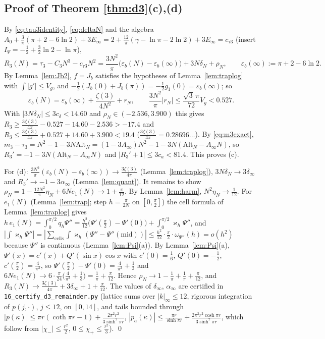 \documentclass[11pt,a4paper]{article}
\theoremstyle{plain}
\theoremstyle{definition}
\numberwithin{equation}{section}
\begin{document}
\subsection{Proof of Theorem \ref{thm:d3}(c),(d)}
By \eqref{eq:tau3identity}, \eqref{eq:deltaN} and the algebra $A_0+\frac3\pi(\pi+2-6\ln2)+3E_\infty=2+\frac{12}\pi(\gamma-\ln\pi-2\ln2)+3E_\infty=c_{\tau3}$ (insert $I_\Psi=-\frac12+\frac32\ln2-\ln\pi$),
\begin{equation}\label{eq:R3}
R_3(N)=\tau_3-C_3N^3-c_{\tau3}N^2=\frac{3N^2}{\pi}\big(\varepsilon_b(N)-\varepsilon_b(\infty)\big)+3N\delta_N+\rho_N,\qquad\varepsilon_b(\infty):=\pi+2-6\ln2 .
\end{equation}
By Lemma~\ref{lem:Jb2}, $f=J_b$ satisfies the hypotheses of Lemma~\ref{lem:traplog} with $\int|g'|\le V_g$, and $-\frac12(J_b(0)+J_b(\pi))=-\frac12g_1(0)=\varepsilon_b(\infty)$; so
\[
\varepsilon_b(N)=\varepsilon_b(\infty)+\frac{\zeta(3)}{4N^2}+r_N,\qquad\frac{3N^2}{\pi}|r_N|\le\frac{\sqrt3\,\pi}{72}V_g<0.527 .
\]
With $|3N\delta_N|\le3c_\delta<14.60$ and $\rho_N\in(-2.536,3.900)$ this gives
$R_3\ge\frac{3\zeta(3)}{4\pi}-0.527-14.60-2.536>-17.4$ and $R_3\le\frac{3\zeta(3)}{4\pi}+0.527+14.60+3.900<19.4$ ($\frac{3\zeta(3)}{4\pi}=0.28696\ldots$).
By \eqref{eq:m3exact}, $m_3-\tau_3=N^2-1-3N\mathrm{Alt}_N=(1-3A_\infty)N^2-1-3N(\mathrm{Alt}_N-A_\infty N)$, so $R_3'=-1-3N(\mathrm{Alt}_N-A_\infty N)$ and $|R_3'+1|\le3c_a<81.4$. This proves (c).

For (d): $\frac{3N^2}{\pi}(\varepsilon_b(N)-\varepsilon_b(\infty))\to\frac{3\zeta(3)}{4\pi}$ (Lemma~\ref{lem:traplog}), $3N\delta_N\to3\delta_\infty$ and $R_3'\to-1-3\alpha_\infty$ (Lemma~\ref{lem:quant}). It remains to show $\rho_N=1-\frac{12N^2}{\pi}\eta_N+6Ne_1(N)\to1+\frac\pi{12}$. By Lemma~\ref{lem:harm}, $N^2\eta_N\to\frac1{12}$. For $e_1(N)$ (Lemma~\ref{lem:trap}; step $h=\frac{\pi}{2N}$ on $[0,\frac\pi2]$) the cell formula of Lemma~\ref{lem:traplog} gives $h\,e_1(N)=\int_0^{\pi/2}q_h\Psi''=\frac{h^2}{12}\big(\Psi'(\frac\pi2)-\Psi'(0)\big)+\int_0^{\pi/2}\varkappa_h\Psi''$, and $|\int\varkappa_h\Psi''|=|\sum_{\mathrm{cells}}\int\varkappa_h(\Psi''-\Psi''(\mathrm{mid}))|\le\frac{h^2}{12}\cdot\frac\pi2\cdot\omega_{\Psi''}(h)=o(h^2)$ because $\Psi''$ is continuous (Lemma~\ref{lem:Psi}(a)). By Lemma~\ref{lem:Psi}(a), $\Psi'(x)=c'(x)+Q'(\sin x)\cos x$ with $c'(0)=\frac16$, $Q'(0)=-\frac12$, $c'(\frac\pi2)=\frac{4}{\pi^2}$, so $\Psi'(\frac\pi2)-\Psi'(0)=\frac4{\pi^2}+\frac13$ and $6Ne_1(N)\to6\cdot\frac{\pi}{24}\big(\frac{4}{\pi^2}+\frac13\big)=\frac1\pi+\frac\pi{12}$. Hence $\rho_N\to1-\frac1\pi+\frac1\pi+\frac\pi{12}$, and $R_3(N)\to\frac{3\zeta(3)}{4\pi}+3\delta_\infty+1+\frac\pi{12}$.
The values of $\delta_\infty$, $\alpha_\infty$ are certified in \texttt{16\_certify\_d3\_remainder.py} (lattice sums over $|k|_\infty\le12$, rigorous integration of $p(j,\cdot)$, $j\le12$, on $[0,14]$, and tails bounded through $|p(\kappa)|\le\pi r(\coth\pi r-1)+\frac{2\pi^2r^2}{3\sinh^2\pi r}$, $|p_a(\kappa)|\le\frac{\pi r}{\sinh\pi r}+\frac{2\pi^2r^2\cosh\pi r}{3\sinh^2\pi r}$, which follow from $|\chi_-|\le\frac{r^2}{2}$, $0\le\chi_+\le\frac{r^2}3$). \qed
\end{document}
